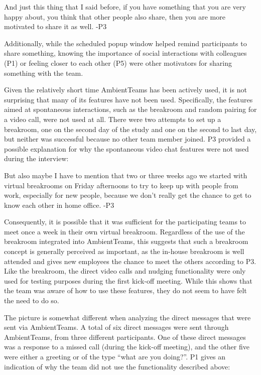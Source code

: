 \begin{displayquote}
    And just this thing that I said before, if you have something that you are very happy about, you think that other people also share, then you are more motivated to share it as well. -P3
\end{displayquote}

Additionally, while the scheduled popup window helped remind participants to share something, knowing the importance of social interactions with colleagues (P1) or feeling closer to each other (P5) were other motivators for sharing something with the team.

Given the relatively short time AmbientTeams has been actively used, it is not surprising that many of its features have not been used. Specifically, the features aimed at spontaneous interactions, such as the breakroom and random pairing for a video call, were not used at all. There were two attempts to set up a breakroom, one on the second day of the study and one on the second to last day, but neither was successful because no other team member joined. P3 provided a possible explanation for why the spontaneous video chat features were not used during the interview:

\begin{displayquote}
    But also maybe I have to mention that two or three weeks ago we started with virtual breakrooms on Friday afternoons to try to keep up with people from work, especially for new people, because we don't really get the chance to get to know each other in home office. -P3
\end{displayquote}

Consequently, it is possible that it was sufficient for the participating teams to meet once a week in their own virtual breakroom. Regardless of the use of the breakroom integrated into AmbientTeams, this suggests that such a breakroom concept is generally perceived as important, as the in-house breakroom is well attended and gives new employees the chance to meet the others according to P3. Like the breakroom, the direct video calls and nudging functionality were only used for testing purposes during the first kick-off meeting. While this shows that the team was aware of how to use these features, they do not seem to have felt the need to do so.

The picture is somewhat different when analyzing the direct messages that were sent via AmbientTeams. A total of six direct messages were sent through AmbientTeams, from three different participants. One of these direct messages was a response to a missed call (during the kick-off meeting), and the other five were either a greeting or of the type \enquote{what are you doing?}. P1 gives an indication of why the team did not use the functionality described above:

